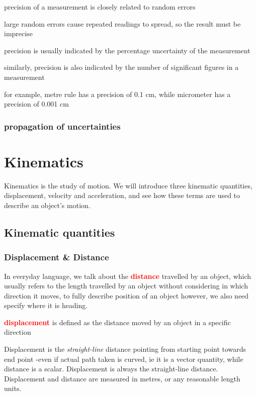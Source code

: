 \documentclass[a4paper,12pt]{book}
\newcounter{example}[chapter]
\newcommand{\cmt}{}
\newenvironment{ilight}
  {\centering
  	\vspace*{6pt}
  	\begin{tcolorbox}[colframe=Gray,colback=LightGrey!15]
  \setlength{\baselineskip}{\baselineskip}%
  }
  {\end{tcolorbox}\vspace*{-4pt}}
\newcommand{\keypoint}[1]{\textbf{\textcolor{red}{#1}}}
\newcommand{\keypoint}[1]{\textbf{\textcolor{red}{#1}}}
\newcommand{\cmt}{}
\begin{document}
\cmt precision of a measurement is closely related to random errors

large random errors cause repeated readings to spread, so the result must be imprecise

\cmt precision is usually indicated by the percentage uncertainty of the measurement

similarly, precision is also indicated by the number of significant figures in a measurement

for example, metre rule has a precision of 0.1 cm, while micrometer has a precision of 0.001 cm

	
	\subsection*{propagation of uncertainties}

\cleardoublepage

\chapter{Kinematics}

Kinematics is the study of motion. We will introduce three kinematic quantities, displacement, velocity and acceleration, and see how these terms are used to describe an object's motion.

\section{Kinematic quantities}

\subsection{Displacement \& Distance}

In everyday language, we talk about the \keypoint{distance} travelled by an object, which usually refers to the length travelled by an object without considering in which direction it moves, to fully describe position of an object however, we also need specify where it is heading.

\begin{ilight}
	\centering \keypoint{displacement} is defined as the distance moved by an object in a specific direction
\end{ilight}

 Displacement is the \emph{straight-line} distance pointing from starting point towards end point -even if actual path taken is curved, ie it is a vector quantity, while distance is a scalar. Displacement is always the straight-line distance. Displacement and distance are measured in metres, or any reasonable length units.
\end{document}
